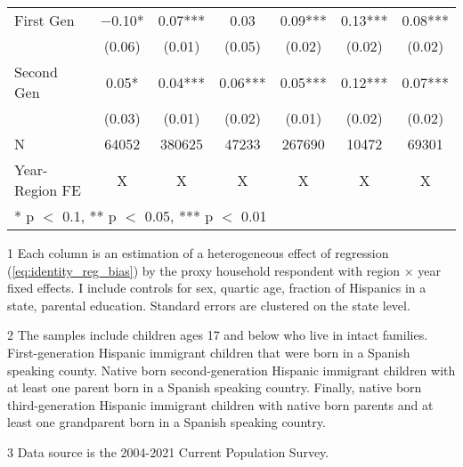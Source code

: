 \begin{table}[H]
{\begin{threeparttable}
\begin{tabular}[t]{lcccccc}
First Gen & \num{-0.10}* & \num{0.07}*** & \num{0.03} & \num{0.09}*** & \num{0.13}*** & \num{0.08}***\\
 & (\num{0.06}) & (\num{0.01}) & (\num{0.05}) & (\num{0.02}) & (\num{0.02}) & (\num{0.02})\\
Second Gen & \num{0.05}* & \num{0.04}*** & \num{0.06}*** & \num{0.05}*** & \num{0.12}*** & \num{0.07}***\\
 & (\num{0.03}) & (\num{0.01}) & (\num{0.02}) & (\num{0.01}) & (\num{0.02}) & (\num{0.02})\\
\midrule
N & \num{64052} & \num{380625} & \num{47233} & \num{267690} & \num{10472} & \num{69301}\\
Year-Region FE & X & X & X & X & X & X\\
\bottomrule
\multicolumn{7}{l}{\rule{0pt}{1em}* p $<$ 0.1, ** p $<$ 0.05, *** p $<$ 0.01}\\
\end{tabular}
\begin{tablenotes}
\small
\item[1] \footnotesize{Each column is an estimation of a heterogeneous effect of regression (\ref{eq:identity_reg_bias}) by 
                      the proxy household respondent with region × year fixed effects. 
                      I include controls for sex, quartic age, fraction of Hispanics in a state, parental education.
                      Standard errors are clustered on the state level.}
\item[2] \footnotesize{The samples include children ages 17 and below who live in intact families. 
                      First-generation Hispanic immigrant children that were born in a 
                      Spanish speaking county. Native born second-generation Hispanic 
                      immigrant children with at least one parent born in a Spanish speaking 
                      country. Finally, native born third-generation Hispanic immigrant children 
                      with native born parents and at least one grandparent born in a Spanish 
                      speaking country.}
\item[3] \footnotesize{Data source is the 2004-2021 Current Population Survey.}
\end{tablenotes}
\end{threeparttable}}
\end{table}
